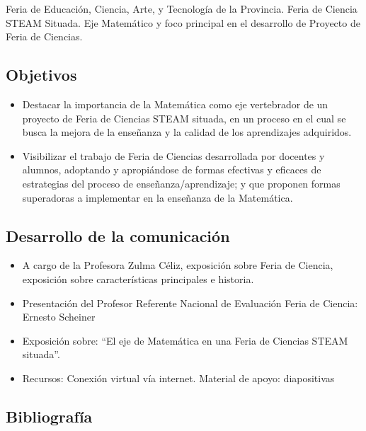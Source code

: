 Feria de Educación, Ciencia, Arte, y Tecnología de la Provincia. Feria de Ciencia STEAM Situada. Eje Matemático y foco principal en el desarrollo de Proyecto de Feria de Ciencias.

\subsection{Objetivos}
\begin{itemize}
	\item Destacar la importancia de la Matemática como eje vertebrador de un proyecto de Feria de Ciencias STEAM situada, en un proceso en el cual se busca la mejora de la enseñanza y la calidad de los aprendizajes adquiridos.
	\item Visibilizar el trabajo de Feria de Ciencias desarrollada por docentes y alumnos, adoptando y apropiándose de formas efectivas y eficaces de estrategias del proceso de enseñanza/aprendizaje; y que proponen formas superadoras a implementar en la enseñanza de la Matemática.
\end{itemize}

\subsection{Desarrollo de la comunicación}

\begin{itemize}
	\item A cargo de la Profesora Zulma Céliz, exposición sobre Feria de Ciencia, exposición sobre características principales e historia.
	\item Presentación del Profesor Referente Nacional de Evaluación Feria de Ciencia: Ernesto Scheiner
	\item Exposición sobre: “El eje de Matemática en una Feria de Ciencias STEAM situada”.
	\item Recursos: Conexión virtual vía internet. Material de apoyo: diapositivas
\end{itemize}

\subsection{Bibliografía}

\nocite{*}
\printbibliography[keyword={14}]